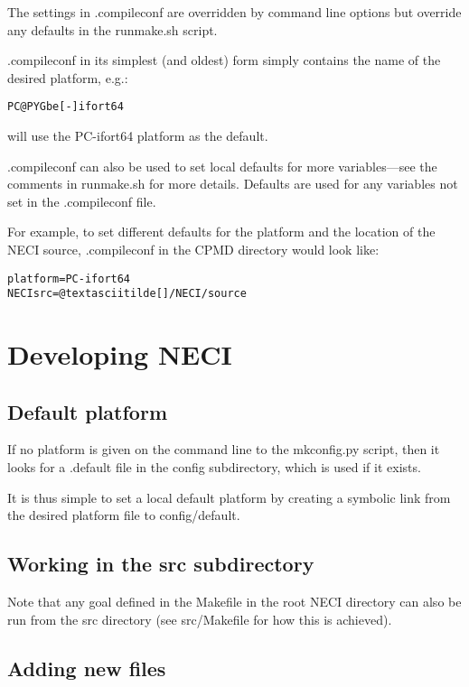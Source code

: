 \documentclass[openany,a4paper,10pt,english]{manual}
\begin{document}
The settings in .compileconf are overridden by command line options but override
any defaults in the runmake.sh script.

.compileconf in its simplest (and oldest) form simply contains the name of the desired
platform, e.g.:

\begin{Verbatim}[commandchars=@\[\]]
PC@PYGbe[-]ifort64
\end{Verbatim}

will use the PC-ifort64 platform as the default.

.compileconf can also be used to set local defaults for more variables---see
the comments in runmake.sh for more details.  Defaults are used for any
variables not set in the .compileconf file.

For example, to set different defaults for the platform and the location of the
NECI source, .compileconf in the CPMD directory would look like:

\begin{Verbatim}[commandchars=@\[\]]
platform=PC-ifort64
NECIsrc=@textasciitilde[]/NECI/source
\end{Verbatim}


\section{Developing NECI}


\subsection{Default platform}

If no platform is given on the command line to the mkconfig.py script, then it
looks for a .default file in the config subdirectory, which is used if it exists.

It is thus simple to set a local default platform by creating a symbolic link from
the desired platform file to config/default.


\subsection{Working in the src subdirectory}

Note that any goal defined in the Makefile in the root NECI directory can also
be run from the src directory (see src/Makefile for how this is achieved).


\subsection{Adding new files}
\end{document}
